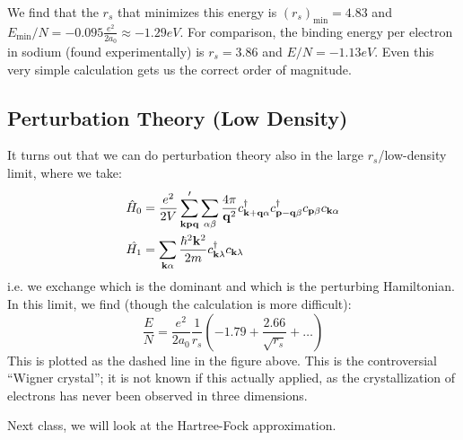 We find that the $r_s$ that minimizes this energy is $(r_s)_{\min} = 4.83$ and $E_{\min}/N = -0.095\frac{e^2}{2a_0} \approx -1.29\si{eV}$. For comparison, the binding energy per electron in sodium (found experimentally) is $r_s = 3.86$ and $E/N = -1.13\si{eV}$. Even this very simple calculation gets us the correct order of magnitude.

\subsection{Perturbation Theory (Low Density)}
It turns out that we can do perturbation theory also in the large $r_s$/low-density limit, where we take:
\begin{align*}
    \hat{H}_0 &= \frac{e^2}{2V}\sum_{\mathbf{k}\mathbf{p}\mathbf{q}}'\sum_{\alpha\beta} \frac{4\pi}{\mathbf{q}^2}c^\dagger_{\mathbf{k} + \mathbf{q}\alpha}c^{\dagger}_{\mathbf{p} - \mathbf{q}\beta}c_{\mathbf{p}\beta}c_{\mathbf{k}\alpha}
    \\ \hat{H_1} &= \sum_{\mathbf{k}\alpha}\frac{\hbar^2\mathbf{k}^2}{2m}c^\dagger_{\mathbf{k}\lambda}c_{\mathbf{k}\lambda}
\end{align*}
i.e. we exchange which is the dominant and which is the perturbing Hamiltonian. In this limit, we find (though the calculation is more difficult):
\begin{equation}\label{eq-pertresultjelliumlowdensity}
    \frac{E}{N} = \frac{e^2}{2a_0}\frac{1}{r_s}\left(-1.79 + \frac{2.66}{\sqrt{r_s}} + \ldots \right)
\end{equation}
This is plotted as the dashed line in the figure above. This is the controversial ``Wigner crystal''; it is not known if this actually applied, as the crystallization of electrons has never been observed in three dimensions.

Next class, we will look at the Hartree-Fock approximation.